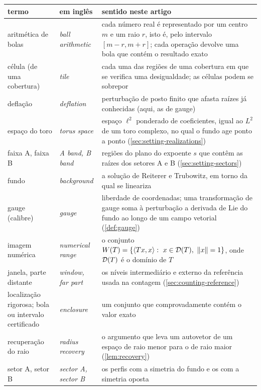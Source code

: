 \begin{table}[tbp]
\centering
\small
\begin{tabular}{@{}>{\raggedright\arraybackslash}p{}>{\raggedright\arraybackslash}p{}
  >{\raggedright\arraybackslash}p{}@{}}
\toprule
termo & em inglês & sentido neste artigo \\
\midrule
aritmética de bolas & \emph{ball arithmetic} & cada número real é representado por um centro $m$ e um raio $r$, isto é,
  pelo intervalo $[m-r,m+r]$; cada operação devolve uma bola que contém o resultado exato \\
célula (de uma cobertura) & \emph{tile} & cada uma das regiões de uma cobertura em que se verifica uma desigualdade; as
  células podem se sobrepor \\
deflação & \emph{deflation} & perturbação de posto finito que afasta raízes já conhecidas (aqui, as de gauge) \\
espaço do toro & \emph{torus space} & espaço $\ell^2$ ponderado de coeficientes, igual ao $L^2$ de um toro complexo, no
  qual o fundo age ponto a ponto (\cref{sec:setting-realizations}) \\
faixa A, faixa B & \emph{A band, B band} & regiões do plano do expoente $s$ que contêm as raízes dos setores A e B
  (\cref{sec:setting-sectors}) \\
fundo & \emph{background} & a solução de Reiterer e Trubowitz, em torno da qual se lineariza \\
gauge (calibre) & \emph{gauge} & liberdade de coordenadas; uma transformação de gauge soma à perturbação a derivada de
  Lie do fundo ao longo de um campo vetorial (\cref{def:gauge}) \\
imagem numérica & \emph{numerical range} & o conjunto $W(T)=\{\langle Tx,x\rangle:\ x\in\Dom(T),\ \|x\|=1\}$, onde $\mathcal{D}(T)$
  é o domínio de $T$ \\
janela, parte distante & \emph{window, far part} & os níveis intermediário e externo da referência usada na contagem
  (\cref{sec:counting-reference}) \\
localização rigorosa; bola ou intervalo certificado & \emph{enclosure} & um conjunto que comprovadamente contém o valor
  exato \\
recuperação do raio & \emph{radius recovery} & o argumento que leva um autovetor de um espaço de raio menor para o de
  raio maior (\cref{lem:recovery}) \\
setor A, setor B & \emph{sector A, sector B} & os perfis com a simetria do fundo e os com a simetria oposta

\end{tabular}
\end{table}
